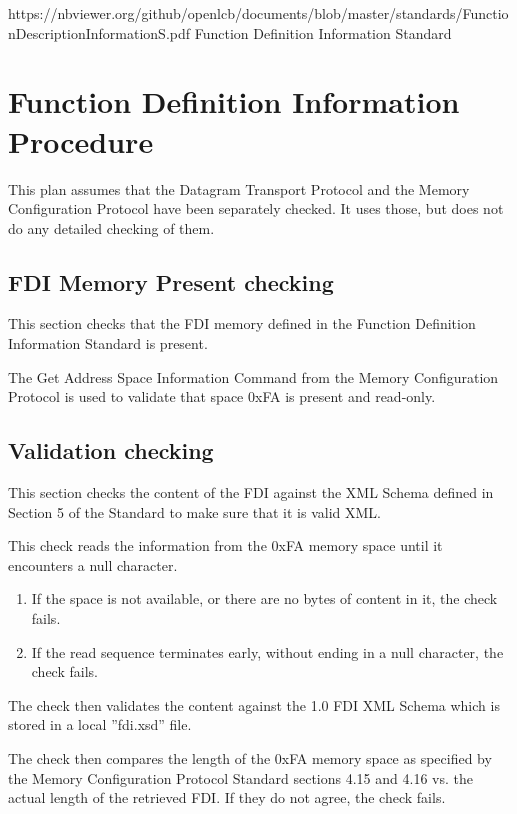 



\maketitle
\thispagestyle{firststyle}

\introductionCaveats
    {https://nbviewer.org/github/openlcb/documents/blob/master/standards/FunctionDescriptionInformationS.pdf}
    {Function Definition Information Standard}

\section{Function Definition Information Procedure}


This plan assumes that the Datagram Transport Protocol and the Memory Configuration Protocol 
have been separately checked. It uses those, but does not do any detailed checking of them.

\subsection{FDI Memory Present checking}

This section checks that the FDI memory defined in the Function 
Definition Information Standard is present.

The Get Address Space Information Command from the Memory Configuration Protocol
is used to validate that space 0xFA is present and read-only.

\subsection{Validation checking}

This section checks the content of the FDI against the XML Schema 
defined in Section 5 of the Standard to make sure that it is valid XML. 

This check reads the information from the 0xFA memory space
until it encounters a null character.
\begin{enumerate}
\item If the space is not available, or there are no bytes of content in it, the check fails.
\item If the read sequence terminates early, without ending in a null character, the check fails.
\end{enumerate}
 
The check then validates the content against the 1.0 FDI XML Schema
which is stored in a local ”fdi.xsd” file.

The check then compares the length of the 0xFA memory space 
as specified by the Memory Configuration Protocol Standard sections 4.15 and 4.16
vs. the actual length of the retrieved FDI.
If they do not agree, the check fails.

  

